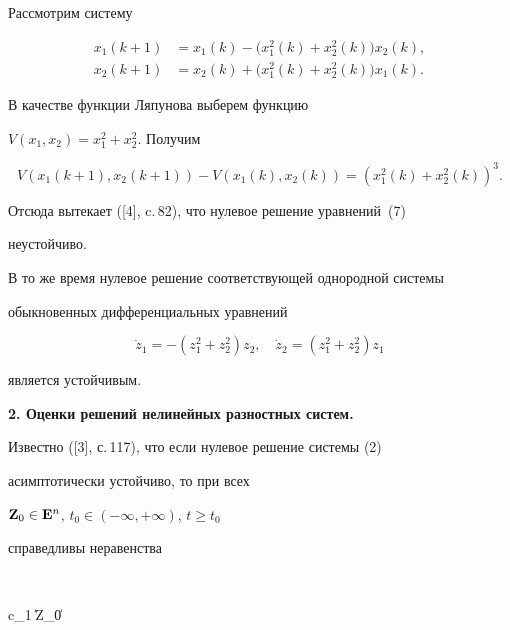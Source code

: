 \begin{exam}


Рассмотрим систему


\begin{equation}


\begin{split}


x_1(k+1)&= x_1(k)-\big(x^2_1(k)+x^2_2(k)\big)x_2(k),\\


x_2(k+1)&= x_2(k)+\big(x^2_1(k)+x^2_2(k)\big)x_1(k).


\end{split}


\end{equation}


В качестве функции Ляпунова выберем функцию


$V(x_1, x_2)=x^2_1+x^2_2$. Получим


$$


V(x_1(k+1), x_2(k+1))-V(x_1(k), x_2(k))={(x^2_1(k)+x^2_2(k))}^3.


$$


Отсюда вытекает ([4], c.\,82), что нулевое решение уравнений~(7)


неустойчиво.





В то же время нулевое решение соответствующей однородной системы


обыкновенных дифференциальных уравнений


$$


\Dot z_1=-(z^2_1+z^2_2)z_2, \quad \Dot z_2=(z^2_1+z^2_2)z_1


$$


является устойчивым.


\end{exam}








{\bf 2. Оценки решений нелинейных разностных систем.}


Известно ([3], с.\,117), что если нулевое решение системы (2)


асимптотически устойчиво, то при всех


$\bold Z_0\in \bold E^n$, $t_0\in (-\infty, +\infty)$, $t\geq t_0$


справедливы неравенства


$$


c_1 \|\bold Z_0\|


